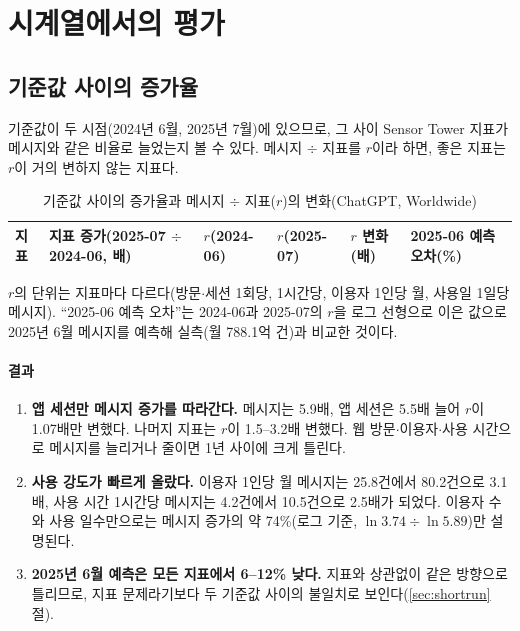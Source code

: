 \documentclass[11pt]{article}
\begin{document}
\section{시계열에서의 평가}

\subsection{기준값 사이의 증가율}

기준값이 두 시점(2024년 6월, 2025년 7월)에 있으므로, 그 사이 Sensor Tower 지표가 메시지와 같은 비율로 늘었는지 볼 수 있다. 메시지 $\div$ 지표를 $r$이라 하면, 좋은 지표는 $r$이 거의 변하지 않는 지표다.

\begin{longtable}{L{4.6cm}R{2.3cm}R{1.8cm}R{1.8cm}R{1.8cm}R{2.3cm}}
\caption{기준값 사이의 증가율과 메시지 $\div$ 지표($r$)의 변화(ChatGPT, Worldwide)}\label{tab:growth}\\
\toprule
지표 & 지표 증가(2025-07 $\div$ 2024-06, 배) & $r$(2024-06) & $r$(2025-07) & $r$ 변화(배) & 2025-06 예측 오차(\%) \\
\midrule
\endhead

\bottomrule
\end{longtable}

\noindent $r$의 단위는 지표마다 다르다(방문$\cdot$세션 1회당, 1시간당, 이용자 1인당 월, 사용일 1일당 메시지). ``2025-06 예측 오차''는 2024-06과 2025-07의 $r$을 로그 선형으로 이은 값으로 2025년 6월 메시지를 예측해 실측(월 788.1억 건)과 비교한 것이다.

\paragraph{결과}
\begin{enumerate}[label=(\arabic*)]
  \item \textbf{앱 세션만 메시지 증가를 따라간다.} 메시지는 5.9배, 앱 세션은 5.5배 늘어 $r$이 1.07배만 변했다. 나머지 지표는 $r$이 1.5--3.2배 변했다. 웹 방문$\cdot$이용자$\cdot$사용 시간으로 메시지를 늘리거나 줄이면 1년 사이에 크게 틀린다.
  \item \textbf{사용 강도가 빠르게 올랐다.} 이용자 1인당 월 메시지는 25.8건에서 80.2건으로 3.1배, 사용 시간 1시간당 메시지는 4.2건에서 10.5건으로 2.5배가 되었다. 이용자 수와 사용 일수만으로는 메시지 증가의 약 74\%(로그 기준, $\ln 3.74 \div \ln 5.89$)만 설명된다.
  \item \textbf{2025년 6월 예측은 모든 지표에서 6--12\% 낮다.} 지표와 상관없이 같은 방향으로 틀리므로, 지표 문제라기보다 두 기준값 사이의 불일치로 보인다(\ref{sec:shortrun}절).
\end{enumerate}
\end{document}
